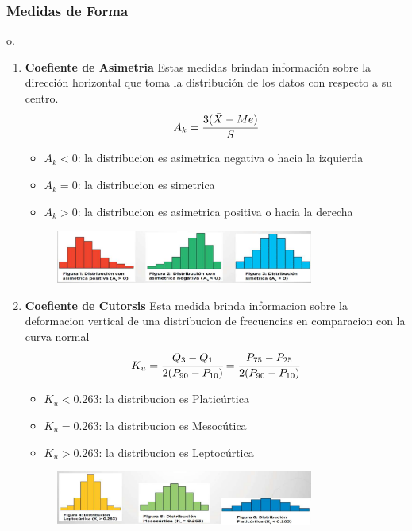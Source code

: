 \documentclass{article}
\begin{document}
        \subsubsection{Medidas de Forma}
        o.
        \begin{enumerate}
            \item\textbf{Coefiente de Asimetria}
                Estas medidas brindan información sobre la dirección horizontal que toma la distribución de los datos con respecto a su centro.
                \[A_k = \cfrac{3(\bar{X} - Me)}{S}\]
                \begin{itemize}
                    \item $A_k<0$: la distribucion es asimetrica negativa o hacia la izquierda
                    \item $A_k=0$: la distribucion es simetrica
                    \item $A_k>0$: la distribucion es asimetrica positiva o hacia la derecha
                \end{itemize}
                \begin{figure}[H]
                    \centering
                    \includegraphics[width=0.8\textwidth]{img/asimetria.png}
                \end{figure}
            \item\textbf{Coefiente de Cutorsis}
                Esta medida brinda informacion sobre la deformacion vertical de una distribucion de frecuencias en comparacion con la curva normal
                \[K_u = \cfrac{Q_3 - Q_1}{2(P_{90} - P_{10})} = \cfrac{P_{75} - P_{25}}{2(P_{90} - P_{10})}\]
                \begin{itemize}
                    \item $K_u<0.263$: la distribucion es Platicúrtica
                    \item $K_u=0.263$: la distribucion es Mesocútica
                    \item $K_u>0.263$: la distribucion es Leptocúrtica
                \end{itemize}
                \begin{figure}[H]
                    \centering
                    \includegraphics[width=0.8\textwidth]{img/kutorisis.png}
                \end{figure}
        \end{enumerate}
\end{document}
